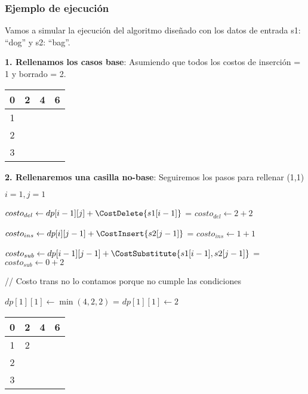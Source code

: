 \subsubsection{Ejemplo de ejecución}
Vamos a simular la ejecución del algoritmo diseñado con los datos de entrada s1: ``dog'' y s2: ``bag''.

\textbf{1. Rellenamos los casos base}: Asumiendo que todos los costos de inserción = 1 y borrado = 2.

\begin{table}[h]
    \centering
    \begin{tabular}{|c|c|c|c|}
    \hline
    0 & 2 & 4 & 6 \\ \hline
    1 &   &   &   \\ \hline
    2 &   &   &   \\ \hline
    3 &   &   &   \\ \hline
    \end{tabular}
\end{table}

\textbf{2. Rellenaremos una casilla no-base}: Seguiremos los pasos para rellenar (1,1)

$i = 1, j = 1$



\begin{tabbing}
    $costo_{del} \leftarrow dp[i-1][j] + \CostDelete{s1[i-1]}$ = $costo_{del} \leftarrow 2 + 2$\;
\end{tabbing}


\begin{tabbing}
    $costo_{ins} \leftarrow dp[i][j-1] + \CostInsert{s2[j-1]} $ = $ costo_{ins} \leftarrow 1 + 1$\;
\end{tabbing}


\begin{tabbing}
    $costo_{sub} \leftarrow dp[i-1][j-1] + \CostSubstitute{s1[i-1], s2[j-1]}$ = $costo_{sub} \leftarrow 0 + 2$\;
\end{tabbing}

// Costo trans no lo contamos porque no cumple las condiciones

$dp[1][1] \leftarrow \min(4, 2, 2)$ = $dp[1][1] \leftarrow 2$

\begin{table}[h]
    \centering
    \begin{tabular}{|c|c|c|c|}
    \hline
    0 & 2 & 4 & 6 \\ \hline
    1 & 2 &   &   \\ \hline
    2 &   &   &   \\ \hline
    3 &   &   &   \\ \hline
    \end{tabular}
\end{table}

